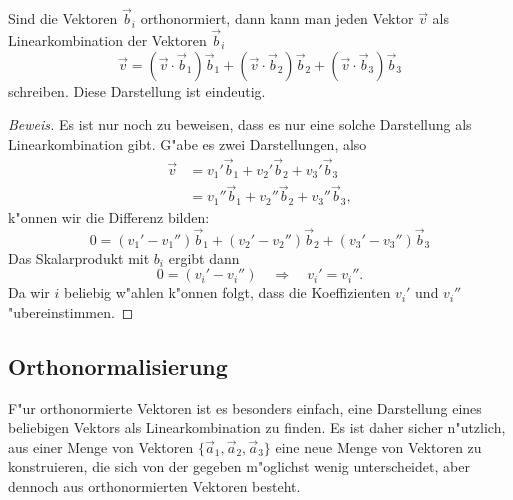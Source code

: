 \begin{satz}
Sind die Vektoren $\vec b_i$ orthonormiert, dann kann man jeden
Vektor $\vec v$ als Linearkombination der Vektoren $\vec b_i$
\[
\vec v=
(\vec v\cdot\vec b_1)\vec b_1
+
(\vec v\cdot\vec b_2)\vec b_2
+
(\vec v\cdot\vec b_3)\vec b_3
\]
schreiben. Diese Darstellung ist eindeutig.
\end{satz}

\begin{proof}[Beweis]
Es ist nur noch zu beweisen, dass es nur eine solche Darstellung als
Linearkombination gibt. G"abe es zwei Darstellungen, also
\begin{align*}
\vec v
&=
v_1'\vec b_1+
v_2'\vec b_2+
v_3'\vec b_3\\
&=
v_1''\vec b_1+
v_2''\vec b_2+
v_3''\vec b_3,
\end{align*}
k"onnen wir die Differenz bilden:
\[
0=
(v_1'-v_1'')\vec b_1
+
(v_2'-v_2'')\vec b_2
+
(v_3'-v_3'')\vec b_3
\]
Das Skalarprodukt mit $b_i$ ergibt dann
\[
0=(v_i'-v_i'')\quad\Rightarrow\quad v_i'=v_i''.
\]
Da wir $i$ beliebig w"ahlen k"onnen folgt, dass die
Koeffizienten $v_i'$ und $v_i''$ "ubereinstimmen.
\end{proof}



\subsection{Orthonormalisierung}
F"ur orthonormierte Vektoren ist es besonders einfach, eine Darstellung
eines beliebigen Vektors als Linearkombination zu finden. Es ist daher
sicher n"utzlich, aus einer Menge von Vektoren
$\{\vec a_1,\vec a_2,\vec a_3\}$ 
eine neue Menge von Vektoren zu konstruieren, die sich von der gegeben
m"oglichst wenig
unterscheidet, aber dennoch aus orthonormierten Vektoren besteht.

